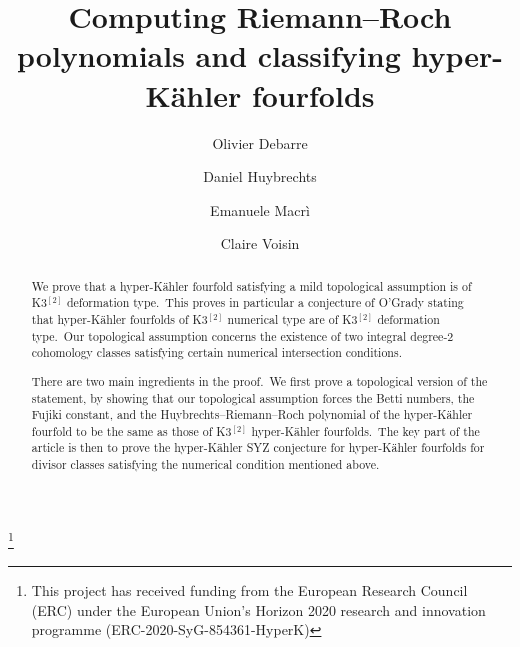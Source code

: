 \documentclass[12pt]{amsart}
\title[Hyper-K\"ahler fourfolds]{Computing Riemann--Roch polynomials and classifying  hyper-K\"ahler fourfolds}
\theoremstyle{remark}
\begin{document}
\author[O.~Debarre]{Olivier Debarre}
\address{Universit\'{e}  Paris Cit\'e and  Sorbonne Universit\'{e}, CNRS, IMJ-PRG, F-75013 Paris, France\vspace{-1mm}}

\author[D.~Huybrechts]{Daniel Huybrechts}
\address{Universit\"at Bonn, Mathematisches Institut and Hausdorff Center for Mathematics, Endenicher Allee 60, 53115 Bonn, Germany\vspace{-1mm}}

\author[E.~Macr\`i]{Emanuele Macr\`i}
\address{Universit\'e Paris-Saclay, CNRS, Laboratoire de Math\'ematiques d'Orsay, Rue Michel Magat, B\^at. 307, 91405 Orsay, France\vspace{-1mm}}

\author[C.~Voisin]{Claire Voisin}
\address{Sorbonne Universit\'{e} and Universit\'{e}  Paris Cit\'e, CNRS, IMJ-PRG, F-75005 Paris, France\vspace{-1mm}}

\thanks{This project has received funding from the European
Research Council (ERC) under the European
Union's Horizon 2020 research and innovation
programme (ERC-2020-SyG-854361-HyperK)}


\begin{abstract}
We prove that a hyper-K\"ahler fourfold satisfying a mild topological assumption is of K3$^{[2]}$ deformation type.\
This proves in particular a conjecture of O'Grady stating that hyper-K\"ahler fourfolds of K3$^{[2]}$ numerical type are of K3$^{[2]}$ deformation type.\
Our topological assumption concerns the existence of two integral degree-2 cohomology classes satisfying certain numerical intersection conditions.

There are two main ingredients in the proof.\
We first prove a topological version of the statement, by showing that our topological assumption forces the Betti numbers, the Fujiki constant, and the Huybrechts--Riemann--Roch polynomial of the hyper-K\"ahler fourfold to be the same as those of K3$^{[2]}$ hyper-K\"ahler fourfolds.\
The key part of the article is then to prove the hyper-K\"ahler SYZ conjecture for hyper-K\"ahler fourfolds for divisor classes satisfying the numerical condition mentioned above.
\end{abstract}
\end{document}
